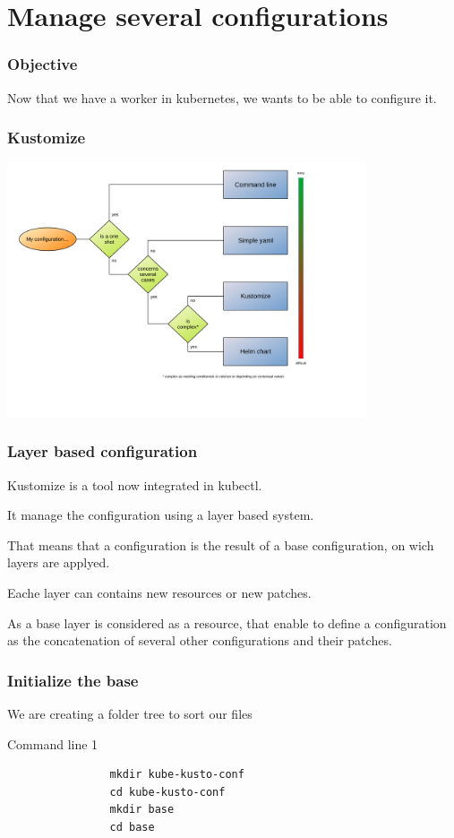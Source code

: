 \section{Manage several configurations}

	\begin{frame}
		\frametitle{Objective}
		
		Now that we have a worker in kubernetes, we wants to be able to configure it.
		
	\end{frame}
	
	\begin{frame}
		\frametitle{Kustomize}
		
		\begin{center}
		\includegraphics[height=7.5cm]{../../../resources/color/choiceConfigKind.pdf}
		\end{center}
	\end{frame}
	
	\begin{frame}
		\frametitle{Layer based configuration}
		
		Kustomize is a tool now integrated in kubectl.
		
		\bigskip
		It manage the configuration using a layer based system.
		
		That means that a configuration is the result of a base configuration, on wich layers are applyed.
		
		Eache layer can contains new resources or new patches.
		
		\bigskip
		As a base layer is considered as a resource, that enable to define a configuration as the concatenation of several other configurations and their patches.
	\end{frame}
	
	\begin{frame}[fragile]
		\frametitle{Initialize the base}
		
		We are creating a folder tree to sort our files
		\begin{block}{Command line 1}
			\begin{verbatim}
				mkdir kube-kusto-conf
				cd kube-kusto-conf
				mkdir base
				cd base
			\end{verbatim}
		\end{block}
	\end{frame}
	
